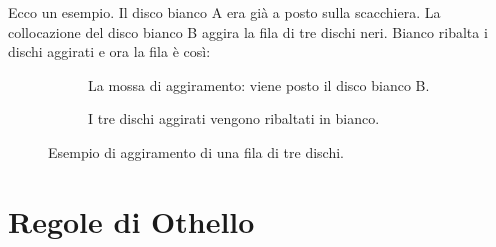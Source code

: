 Ecco un esempio. Il disco bianco A era già a posto sulla scacchiera. La
collocazione del disco bianco B aggira la fila di tre dischi neri.
Bianco ribalta i dischi aggirati e ora la fila è così:

\begin{figure}[htbp]
  \centering
  \begin{subfigure}[b]{0.45\textwidth}
    \centering
    \caption{La mossa di aggiramento: viene posto il disco bianco B.}
  \end{subfigure}
  \hfill
  \begin{subfigure}[b]{0.45\textwidth}
    \centering
    \caption{I tre dischi aggirati vengono ribaltati in bianco.}
  \end{subfigure}
  \caption{Esempio di aggiramento di una fila di tre dischi.}
  \label{fig:rules-outflank}
\end{figure}

\section{Regole di Othello}

